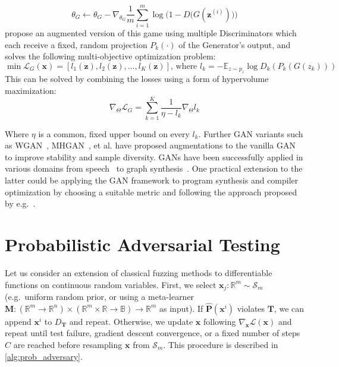 \begin{equation}
\theta_G \leftarrow \theta_G - \nabla_{\theta_G}\frac{1}{m}\sum_{i=1}^m \log\Big(1 - D\big(G(\mathbf z^{(i)})\big)\Big)
\end{equation}
%
\citet{albuquerque2019hgan} propose an augmented version of this game using multiple Discriminators which each receive a fixed, random projection $P_k(\cdot)$ of the Generator's output, and solves the following multi-objective optimization problem:
%
\begin{equation} \label{eq:moo_spec}
\min \mathbf{\mathcal{L}}_G(\mathbf x) = \left[l_1(\mathbf z), l_2(\mathbf z), \ldots, l_K(\mathbf z)\right] \text{, where } l_k = -\mathbb E_{z \sim p_z} \log D_k(P_k(G(z_k)))
\end{equation}
%
This can be solved by combining the losses using a form of hypervolume maximization:
%
\begin{equation}
\nabla_\Theta \mathcal{L}_G = \sum_{k=1}^K \frac{1}{\eta - l_k}\nabla_\Theta l_k
\end{equation}

Where $\eta$ is a common, fixed upper bound on every $l_k$. Further GAN variants such as WGAN~\citep{arjovsky2017wgan}, MHGAN~\citep{turner2019mhgan}, et al. have proposed augmentations to the vanilla GAN to improve stability and sample diversity. GANs have been successfully applied in various domains from speech~\citep{donahue2019wavegan} to graph synthesis~\citep{wang2018graphgan}. One practical extension to the latter could be applying the GAN framework to program synthesis and compiler optimization by choosing a suitable metric and following the approach proposed by e.g.~\citet{adams2019learning, mendis2019compiler}.
%
\section{Probabilistic Adversarial Testing}\label{sec:prob_ad_test}

%

Let us consider an extension of classical fuzzing methods to differentiable functions on continuous random variables. First, we select $\mathbf{x}_j: \mathbb{R}^m \sim \mathcal S_m$ (e.g.\ uniform random prior, or using a meta-learner $\mathbf M: (\mathbb{R}^m \rightarrow \mathbb{R}^n) \times (\mathbb{R}^m \times \mathbb R \rightarrow \mathbb B) \rightarrow \mathbb{R}^m$ as input). If $\mathbf{\hat P}(\mathbf{x}^i)$ violates $\mathbf T$, we can append $\mathbf x^i$ to $D_\mathbf T$ and repeat. Otherwise, we update $\mathbf x$ following $\nabla_{\mathbf x}\mathcal{L}(\mathbf{x})$ and repeat until test failure, gradient descent convergence, or a fixed number of steps $C$ are reached before resampling $\mathbf{x}$ from $\mathcal S_m$. This procedure is described in \autoref{alg:prob_adversary}.

